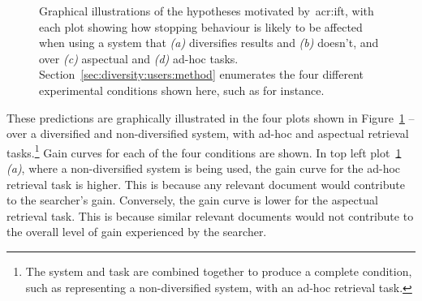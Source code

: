 \begin{figure}[t!]
    \centering
    \caption[\gls{acr:ift} and diversification: hypothesis illustrations]{Graphical illustrations of the hypotheses motivated by~\gls{acr:ift}, with each plot showing how stopping behaviour is likely to be affected when using a system that \emph{(a)} diversifies results and \emph{(b)} doesn't, and over \emph{(c)} aspectual and \emph{(d)} ad-hoc tasks. Section~\ref{sec:diversity:users:method} enumerates the four different experimental conditions shown here, such as  for instance.}
    \label{fig:ift_theory}
\end{figure}

These predictions are graphically illustrated in the four plots shown in Figure~\ref{fig:ift_theory} -- over a diversified  and non-diversified  system, with ad-hoc  and aspectual  retrieval tasks.\footnote{The system and task are combined together to produce a complete condition, such as  representing a non-diversified system, with an ad-hoc retrieval task.} Gain curves for each of the four conditions are shown. In top left plot~\ref{fig:ift_theory} \emph{(a)}, where a non-diversified system is being used, the gain curve for the ad-hoc retrieval task is higher. This is because any relevant document would contribute to the searcher's gain. Conversely, the gain curve is lower for the aspectual retrieval task. This is because similar relevant documents would not contribute to the overall level of gain experienced by the searcher.

